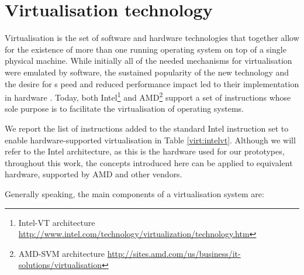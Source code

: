 
\section{Virtualisation technology} \label{virt:tech}
Virtualisation is the set of software and hardware technologies that together allow for the existence of more than one running operating system on top of a single physical machine. While initially all of the needed mechanisms for virtualisation were emulated by software, the sustained popularity of the new technology and the desire for s
peed and reduced performance impact led to their implementation in hardware \cite{softhard, Uhlig:2005:IVT:1069588.1069634}. Today, both Intel\footnote{Intel-VT architecture \url{http://www.intel.com/technology/virtualization/technology.htm}} and AMD\footnote{AMD-SVM architecture \url{http://sites.amd.com/us/business/it-solutions/virtualisation}} support a set of instructions whose sole purpose is to facilitate the virtualisation of operating systems. %

We report the list of instructions added to the standard Intel instruction set to enable hardware-supported virtualisation in Table \ref{virt:intelvt}.
Although we will refer to the Intel architecture, as this is the hardware used for our prototypes, throughout this work, the concepts introduced here can be applied to equivalent hardware, supported by AMD and other vendors.


Generally speaking, the main components of a virtualisation system are:

